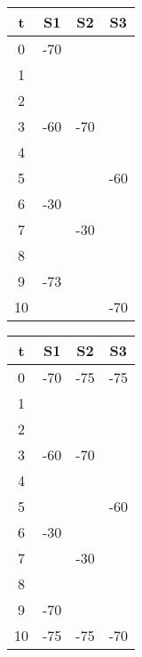 \begin{figure}[H]
    \label{fig:datamodelling:tables}
    \centering
    \begin{minipage}[t]{0.3\textwidth}
        \centering
        \begin{tabular}{ |c||c|c|c| }
             \hline
             t & S1 & S2 & S3 \\
             \hline
             0  & -70 &  & \\ 
             1  &  &  & \\ 
             2  &  &  & \\ 
             3  & -60 & -70 & \\ 
             4  &  &  & \\ 
             5  &  &  & -60 \\ 
             6  & -30 &  & \\ 
             7  &  & -30 & \\ 
             8  &  &  & \\ 
             9  & -73 &  & \\ 
             10 &  &  & -70 \\
             \hline
        \end{tabular}
        \label{fig:datamodelling:tables:1}
    \end{minipage}
    \hfill
    \begin{minipage}[t]{0.3\textwidth}
        \centering
        \begin{tabular}{ |c||c|c|c| } 
             \hline
             t & S1 & S2 & S3 \\
             \hline
             0  & -70 & -75 & -75 \\ 
             1  &  &  & \\ 
             2  &  &  & \\ 
             3  & -60 & -70 & \\ 
             4  &  &  & \\ 
             5  &  &  & -60 \\ 
             6  & -30 &  & \\ 
             7  &  & -30 & \\ 
             8  &  &  & \\ 
             9  & -70 &  & \\ 
             10 & -75 & -75 & -70 \\

\end{tabular}
\end{minipage}
\end{figure}
